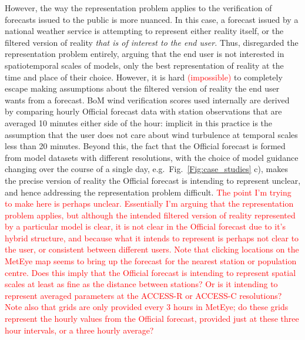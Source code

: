 \documentclass{ametsoc}
\begin{document}
However, the way the representation problem applies to the verification of forecasts issued to the public is more nuanced. In this case, a forecast issued by a national weather service is attempting to represent either reality itself, or the filtered version of reality \textit{that is of interest to the end user.} Thus, \citet{pinson12} disregarded the representation problem entirely, arguing that the end user is not interested in spatiotemporal scales of models, only the best representation of reality at the time and place of their choice. However, it is hard \textcolor{red}{(impossible)} to completely escape making assumptions about the filtered version of reality the end user wants from a forecast. BoM wind verification scores used internally are derived by comparing hourly Official forecast data with station observations that are averaged 10 minutes either side of the hour: implicit in this practice is the assumption that the user does not care about wind turbulence at temporal scales less than 20 minutes. Beyond this, the fact that the Official forecast is formed from model datasets with different resolutions, with the choice of model guidance changing over the course of a single day, e.g.~Fig.~\ref{Fig:case_studies} c), makes the precise version of reality the Official forecast is intending to represent unclear, and hence addressing the representation problem difficult. \textcolor{red}{The point I'm trying to make here is perhaps unclear. Essentially I'm arguing that the representation problem applies, but although the intended filtered version of reality represented by a particular model is clear, it is not clear in the Official forecast due to it's hybrid structure, and because what it intends to represent is perhaps not clear to the user, or consistent between different users. Note that clicking locations on the MetEye map seems to bring up the forecast for the nearest station or population centre. Does this imply that the Official forecast is intending to represent spatial scales at least as fine as the distance between stations? Or is it intending to represent averaged parameters at the ACCESS-R or ACCESS-C resolutions? Note also that grids are only provided every 3 hours in MetEye; do these grids represent the hourly values from the Official forecast, provided just at these three hour intervals, or a three hourly average?}
\end{document}
